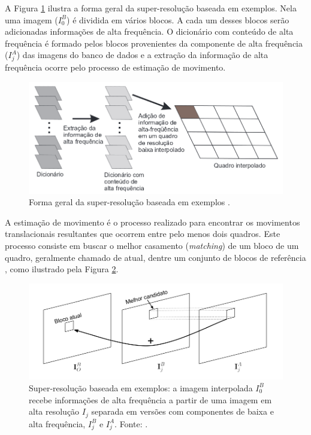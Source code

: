 A Figura \ref{fig:SR_exemp} ilustra a forma geral da super-resolução baseada em exemplos. Nela uma imagem ($I_0^B$) é dividida em vários blocos. A cada um desses blocos serão adicionadas informações de alta frequência. O dicionário com conteúdo de alta frequência é formado pelos blocos provenientes da componente de alta frequência ($I_j^A$) das imagens do banco de dados e a extração da informação de alta frequência ocorre pelo processo de estimação de movimento.


\begin{figure}[h]
	\centering
	\includegraphics[scale=0.50]{figuras/super_resolucao_1.png}
	\caption{Forma geral da super-resolução baseada em exemplos \cite{hung2013realce}.}
	\label{fig:SR_exemp}
\end{figure}

A estimação de movimento é o processo realizado para encontrar os movimentos translacionais resultantes que ocorrem entre pelo menos dois quadros. Este processo consiste em buscar o melhor casamento (\textit{matching}) de um bloco de um quadro, geralmente chamado de atual, dentre um conjunto de blocos de referência \cite{hung2013realce}, como ilustrado pela Figura \ref{fig:SR_4}.

\begin{figure}[h]
	\centering
	\includegraphics[scale=0.50]{figuras/superresolucao_4.png}
	\caption{Super-resolução baseada em exemplos: a imagem interpolada $I_0^B$ recebe informações de alta frequência a partir de uma imagem em alta resolução $I_j$ separada em versões com componentes de baixa e alta frequência, $I_j^B$ e $I_j^A$. Fonte: \cite{garcia2013tecnicas}.}

	\label{fig:SR_4}
\end{figure}

